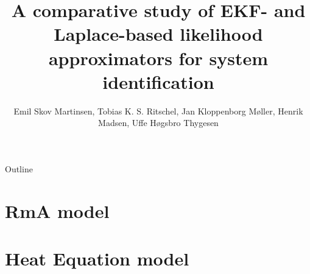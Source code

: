 \documentclass[8pt,aspectratio=169,xcolor=table]{beamer}
\author{Emil Skov Martinsen, Tobias K. S. Ritschel, Jan Kloppenborg Møller, Henrik Madsen, Uffe Høgsbro Thygesen}
\title{A comparative study of EKF- and Laplace-based likelihood approximators for system identification}
\begin{document}
\inserttitlepage


\begin{frame}{Outline}
   \tableofcontents 
\end{frame}

\section{RmA model}



\section{Heat Equation model}

\end{document}
